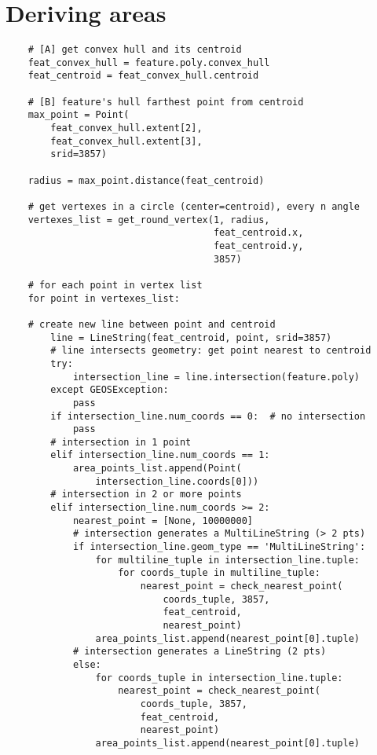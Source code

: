 \section{Deriving areas}
\label{sec:code-area}

    \begin{lstlisting}
    # [A] get convex hull and its centroid
    feat_convex_hull = feature.poly.convex_hull
    feat_centroid = feat_convex_hull.centroid

    # [B] feature's hull farthest point from centroid
    max_point = Point(
        feat_convex_hull.extent[2],
        feat_convex_hull.extent[3],
        srid=3857)

    radius = max_point.distance(feat_centroid)

    # get vertexes in a circle (center=centroid), every n angle
    vertexes_list = get_round_vertex(1, radius,
                                     feat_centroid.x,
                                     feat_centroid.y,
                                     3857)

    # for each point in vertex list
    for point in vertexes_list:

    # create new line between point and centroid
        line = LineString(feat_centroid, point, srid=3857)
        # line intersects geometry: get point nearest to centroid
        try:
            intersection_line = line.intersection(feature.poly)
        except GEOSException:
            pass
        if intersection_line.num_coords == 0:  # no intersection
            pass
        # intersection in 1 point
        elif intersection_line.num_coords == 1:
            area_points_list.append(Point(
                intersection_line.coords[0]))
        # intersection in 2 or more points
        elif intersection_line.num_coords >= 2:
            nearest_point = [None, 10000000]
            # intersection generates a MultiLineString (> 2 pts)
            if intersection_line.geom_type == 'MultiLineString':
                for multiline_tuple in intersection_line.tuple:
                    for coords_tuple in multiline_tuple:
                        nearest_point = check_nearest_point(
                            coords_tuple, 3857,
                            feat_centroid,
                            nearest_point)
                area_points_list.append(nearest_point[0].tuple)
            # intersection generates a LineString (2 pts)
            else:
                for coords_tuple in intersection_line.tuple:
                    nearest_point = check_nearest_point(
                        coords_tuple, 3857,
                        feat_centroid,
                        nearest_point)
                area_points_list.append(nearest_point[0].tuple)


\end{lstlisting}

